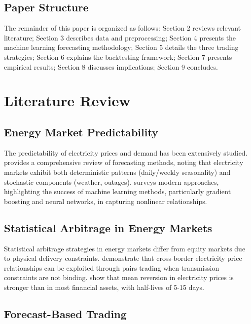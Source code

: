 \documentclass[12pt,a4paper]{article}
\begin{document}
\subsection{Paper Structure}

The remainder of this paper is organized as follows: Section 2 reviews relevant literature; Section 3 describes data and preprocessing; Section 4 presents the machine learning forecasting methodology; Section 5 details the three trading strategies; Section 6 explains the backtesting framework; Section 7 presents empirical results; Section 8 discusses implications; Section 9 concludes.

\section{Literature Review}

\subsection{Energy Market Predictability}

The predictability of electricity prices and demand has been extensively studied. \cite{weron2014electricity} provides a comprehensive review of forecasting methods, noting that electricity markets exhibit both deterministic patterns (daily/weekly seasonality) and stochastic components (weather, outages). \cite{nowotarski2018recent} surveys modern approaches, highlighting the success of machine learning methods, particularly gradient boosting and neural networks, in capturing nonlinear relationships.

\subsection{Statistical Arbitrage in Energy Markets}

Statistical arbitrage strategies in energy markets differ from equity markets due to physical delivery constraints. \cite{karakatsani2008forecasting} demonstrate that cross-border electricity price relationships can be exploited through pairs trading when transmission constraints are not binding. \cite{bunn2016analysis} show that mean reversion in electricity prices is stronger than in most financial assets, with half-lives of 5-15 days.

\subsection{Forecast-Based Trading}
\end{document}
